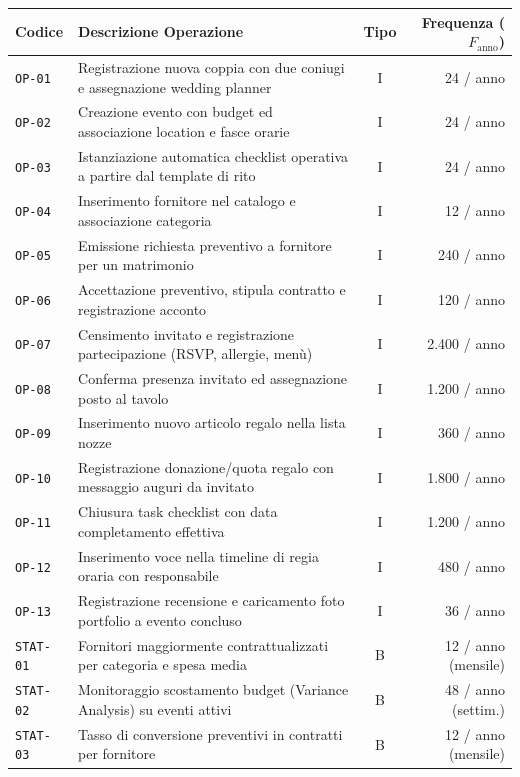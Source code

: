\begin{table}[h!]
\centering
\small
\begin{tabularx}{\textwidth}{l p{7.5cm} c r}
\toprule
\textbf{Codice} & \textbf{Descrizione Operazione} & \textbf{Tipo} & \textbf{Frequenza ($F_{\text{anno}}$)} \\
\midrule
\texttt{OP-01} & Registrazione nuova coppia con due coniugi e assegnazione wedding planner & I & 24 / anno \\
\texttt{OP-02} & Creazione evento con budget ed associazione location e fasce orarie & I & 24 / anno \\
\texttt{OP-03} & Istanziazione automatica checklist operativa a partire dal template di rito & I & 24 / anno \\
\texttt{OP-04} & Inserimento fornitore nel catalogo e associazione categoria & I & 12 / anno \\
\texttt{OP-05} & Emissione richiesta preventivo a fornitore per un matrimonio & I & 240 / anno \\
\texttt{OP-06} & Accettazione preventivo, stipula contratto e registrazione acconto & I & 120 / anno \\
\texttt{OP-07} & Censimento invitato e registrazione partecipazione (RSVP, allergie, menù) & I & 2.400 / anno \\
\texttt{OP-08} & Conferma presenza invitato ed assegnazione posto al tavolo & I & 1.200 / anno \\
\texttt{OP-09} & Inserimento nuovo articolo regalo nella lista nozze & I & 360 / anno \\
\texttt{OP-10} & Registrazione donazione/quota regalo con messaggio auguri da invitato & I & 1.800 / anno \\
\texttt{OP-11} & Chiusura task checklist con data completamento effettiva & I & 1.200 / anno \\
\texttt{OP-12} & Inserimento voce nella timeline di regia oraria con responsabile & I & 480 / anno \\
\texttt{OP-13} & Registrazione recensione e caricamento foto portfolio a evento concluso & I & 36 / anno \\
\midrule
\texttt{STAT-01}& Fornitori maggiormente contrattualizzati per categoria e spesa media & B & 12 / anno (mensile) \\
\texttt{STAT-02}& Monitoraggio scostamento budget (Variance Analysis) su eventi attivi & B & 48 / anno (settim.) \\
\texttt{STAT-03}& Tasso di conversione preventivi in contratti per fornitore & B & 12 / anno (mensile) \\

\end{tabularx}
\end{table}
